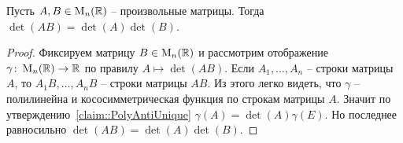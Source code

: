 \begin{claim}\label{claim::DetMulti}
Пусть $A,B\in\operatorname{M}_{n}(\mathbb R)$ -- произвольные матрицы. Тогда $\det(AB) = \det(A)\det(B)$.
\end{claim}
\begin{proof}
Фиксируем матрицу $B\in\operatorname{M}_{n}(\mathbb R)$ и рассмотрим отображение $\gamma\colon \operatorname{M}_{n}(\mathbb R)\to \mathbb R$ по правилу $A\mapsto \det(AB)$. Если $A_1,\ldots, A_n$ -- строки матрицы $A$, то $A_1B, \ldots, A_nB$ -- строки матрицы $AB$. Из этого легко видеть, что $\gamma$ -- полилинейна и кососимметрическая функция по строкам матрицы $A$. Значит по утверждению~\ref{claim::PolyAntiUnique} $\gamma(A) = \det(A)\gamma(E)$. Но последнее равносильно $\det(AB) = \det(A)\det (B)$.
\end{proof}
